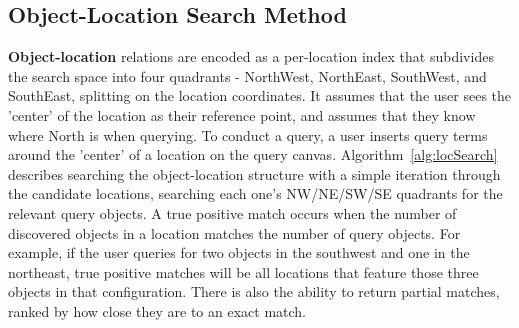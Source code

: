 \begin{algorithm}[h!]
\begin{algorithmic}
                \Else
                \EndIf 
            \EndFor
        \EndProcedure
    \end{algorithmic}
\end{algorithm}


\subsection{Object-Location Search Method}
\textbf{Object-location} relations are encoded as a per-location index that subdivides the search space into four quadrants - NorthWest, NorthEast, SouthWest, and SouthEast, splitting on the location coordinates.
It assumes that the user sees the 'center' of the location as their reference point, and assumes that they know where North is when querying. 
To conduct a query, a user inserts query terms around the 'center' of a location on the query canvas. 
Algorithm~\ref{alg:locSearch} describes searching the object-location structure with a simple iteration through the candidate locations, searching each one's NW/NE/SW/SE quadrants for the relevant query objects.
A true positive match occurs when the number of discovered objects in a location matches the number of query objects.
For example, if the user queries for two objects in the southwest and one in the northeast, true positive matches will be all locations that feature those three objects in that configuration. 
There is also the ability to return partial matches, ranked by how close they are to an exact match.


